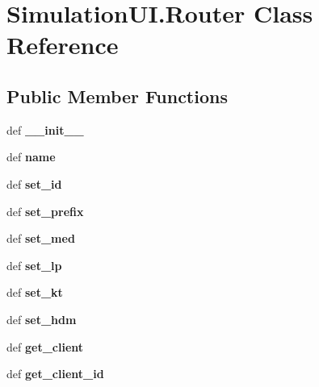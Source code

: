 \hypertarget{classSimulationUI_1_1Router}{\section{Simulation\-U\-I.\-Router Class Reference}
\label{classSimulationUI_1_1Router}
}
\subsection*{Public Member Functions}
\begin{DoxyCompactItemize}
\item 
\hypertarget{classSimulationUI_1_1Router_a4809b7bf5978d807a2a422809b1c20d6}{def {\bfseries \-\_\-\-\_\-init\-\_\-\-\_\-}}\label{classSimulationUI_1_1Router_a4809b7bf5978d807a2a422809b1c20d6}

\item 
\hypertarget{classSimulationUI_1_1Router_ab6e707d1cd194f213b9d825d2ff78c2a}{def {\bfseries name}}\label{classSimulationUI_1_1Router_ab6e707d1cd194f213b9d825d2ff78c2a}

\item 
\hypertarget{classSimulationUI_1_1Router_a7664f78faaacf4bb74774500f65d051a}{def {\bfseries set\-\_\-id}}\label{classSimulationUI_1_1Router_a7664f78faaacf4bb74774500f65d051a}

\item 
\hypertarget{classSimulationUI_1_1Router_af1b3d1af7d3dcaf1177156130cde82a1}{def {\bfseries set\-\_\-prefix}}\label{classSimulationUI_1_1Router_af1b3d1af7d3dcaf1177156130cde82a1}

\item 
\hypertarget{classSimulationUI_1_1Router_ae6e2b716c31c96fe6e260ae6a7acfccf}{def {\bfseries set\-\_\-med}}\label{classSimulationUI_1_1Router_ae6e2b716c31c96fe6e260ae6a7acfccf}

\item 
\hypertarget{classSimulationUI_1_1Router_a4c5dfe9398171dfc4b85009a89254620}{def {\bfseries set\-\_\-lp}}\label{classSimulationUI_1_1Router_a4c5dfe9398171dfc4b85009a89254620}

\item 
\hypertarget{classSimulationUI_1_1Router_a7a4d083242dc4bc52a01a676dcd95165}{def {\bfseries set\-\_\-kt}}\label{classSimulationUI_1_1Router_a7a4d083242dc4bc52a01a676dcd95165}

\item 
\hypertarget{classSimulationUI_1_1Router_ae77074399eb15c051a3aaee204db5708}{def {\bfseries set\-\_\-hdm}}\label{classSimulationUI_1_1Router_ae77074399eb15c051a3aaee204db5708}

\item 
\hypertarget{classSimulationUI_1_1Router_aa0d250843e405086002d59c004d46a5a}{def {\bfseries get\-\_\-client}}\label{classSimulationUI_1_1Router_aa0d250843e405086002d59c004d46a5a}

\item 
\hypertarget{classSimulationUI_1_1Router_a9dde9a190d7a35600965b008f261834d}{def {\bfseries get\-\_\-client\-\_\-id}}\label{classSimulationUI_1_1Router_a9dde9a190d7a35600965b008f261834d}

\end{DoxyCompactItemize}
